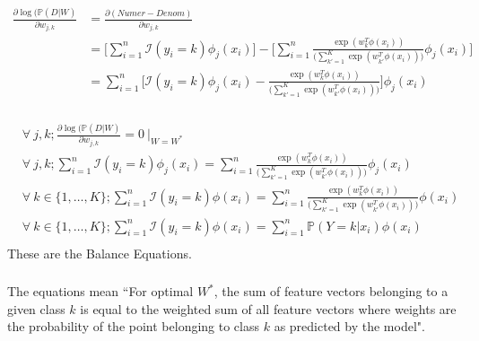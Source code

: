 \documentclass[12pt, fleqn]{article}
\begin{document}
\subsubsection{}
\begin{equation*}
  \begin{aligned}
    \frac{\partial \log (\mathbb{P}(D|W)}{\partial w_{j,k}} & = \frac{\partial (Numer - Denom)}{\partial w_{j,k}}                                                                                                                                           \\
                                                            & = \bigg[ \sum_{i=1}^n \mathcal{I}(y_i = k) \phi_j(x_i) \bigg] - \bigg[ \sum_{i=1}^n \frac{\exp (w_{k}^T \phi(x_i))}{\bigg( \sum_{k'=1}^K \exp (w_{k'}^T \phi(x_i)) \bigg)} \phi_j(x_i) \bigg] \\
                                                            & = \sum_{i=1}^n \bigg[ \mathcal{I}(y_i = k) \phi_j(x_i) - \frac{\exp (w_{k}^T \phi(x_i))}{\bigg( \sum_{k'=1}^K \exp (w_{k'}^T \phi(x_i)) \bigg)} \bigg] \phi_j(x_i)
  \end{aligned}
\end{equation*}

\subsubsection{}
\begin{equation*}
  \begin{aligned}
     & \forall \ j,k;  \frac{\partial \log (\mathbb{P}(D|W)}{\partial w_{j,k}} = 0 \ \bigg\vert_{W = W^*}                                                                                           \\
     & \forall \ j,k;  \sum_{i=1}^n \mathcal{I}(y_i = k) \phi_j(x_i) = \sum_{i=1}^n \frac{\exp (w_{k}^T \phi(x_i))}{\bigg( \sum_{k'=1}^K \exp (w_{k'}^T \phi(x_i)) \bigg)} \phi_j(x_i)              \\
     & \forall \ k \in \{1, \dots, K\}; \sum_{i=1}^n \mathcal{I}(y_i = k) \phi(x_i) = \sum_{i=1}^n \frac{\exp (w_{k}^T \phi(x_i))}{\bigg( \sum_{k'=1}^K \exp (w_{k'}^T \phi(x_i)) \bigg)} \phi(x_i) \\
     & \forall \ k \in \{1, \dots, K\}; \sum_{i=1}^n \mathcal{I}(y_i = k) \phi(x_i) = \sum_{i=1}^n \mathbb{P}(Y = k | x_i) \phi(x_i)                                                                \\
  \end{aligned}
\end{equation*}
These are the Balance Equations.

\subsubsection{}
The equations mean ``For optimal $W^*$, the sum of feature vectors belonging to a given class $k$ is equal to the weighted sum of all feature vectors where weights are the probability of the point belonging to class $k$ as predicted by the model".
\end{document}
